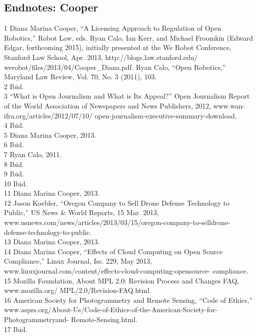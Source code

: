 \begin{itemize}
\section{Endnotes: Cooper}
1 Diana Marina Cooper, ``A Licensing Approach to Regulation of Open Robotics,'' Robot Law, eds.
Ryan Calo, Ian Kerr, and Michael Froomkin (Edward Edgar, forthcoming 2015), initially presented
at the We Robot Conference, Stanford Law School, Apr. 2013, http://blogs.law.stanford.edu/
werobot/files/2013/04/Cooper_Diana.pdf. Ryan Calo, ``Open Robotics,'' Maryland Law Review,
Vol. 70, No. 3 (2011), 103.\\
2 Ibid.\\
3 ``What is Open Journalism and What is Its Appeal?'' Open Journalism Report of the World
Association of Newspapers and News Publishers, 2012, www.wan-ifra.org/articles/2012/07/10/
open-journalism-executive-summary-download.\\
4 Ibid.\\
5 Diana Marina Cooper, 2013.\\
6 Ibid.\\
7 Ryan Calo, 2011.\\
8 Ibid.\\
9 Ibid.\\
10 Ibid.\\
11 Diana Marina Cooper, 2013.\\
12 Jason Koebler, ``Oregon Company to Sell Drone Defense Technology to Public,'' US News & World
Reports, 15 Mar. 2013, www.usnews.com/news/articles/2013/03/15/oregon-company-to-selldrone-
defense-technology-to-public.\\
13 Diana Marina Cooper, 2013.\\
14 Diana Marina Cooper, ``Effects of Cloud Computing on Open Source Compliance,'' Linux
Journal, Iss. 229, May 2013, www.linuxjournal.com/content/effects-cloud-computing-opensource-
compliance.\\
15 Mozilla Foundation, About MPL 2.0: Revision Process and Changes FAQ, www.mozilla.org/
MPL/2.0/Revision-FAQ.html.\\
16 American Society for Photogrammetry and Remote Sensing, ``Code of Ethics,''
www.asprs.org/About-Us/Code-of-Ethics-of-the-American-Society-for-Photogrammetryand-
Remote-Sensing.html.\\
17 Ibid.\\


\end{itemize}
